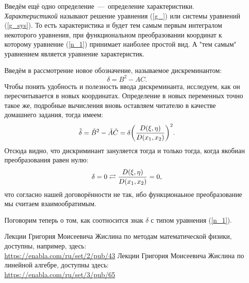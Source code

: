 \documentclass[a4paper,russian]{article}
\begin{document}
Введём ещё одно определение~---~определение характеристики. \emph{Характеристикой} называют решение уравнения (\ref{g_}) или системы уравнений (\ref{g_sys}). То есть характеристика и будет тем самым первым интегралом некоторого уравнения, при функциональном преобразовании координат к которому уравнение (\ref{n_1}) принимает наиболее простой вид. А "тем самым" уравнением является уравнение характеристик.   
\par
Введём в рассмотрение новое обозначение, называемое дискреминантом:
\begin{equation}\label{d}
\delta = B^2-AC.
\end{equation}
Чтобы понять удобность и полезность ввода дискреминанта, исследуем, как он пересчитывается в новых координатах. Определение в новых переменных точно такое же, подробные вычисления вновь оставляем читателю в качестве домашнего задания, тогда имеем:
\begin{equation}\label{d_}
	\tilde \delta = \tilde B^2 - \tilde A \tilde C = \delta \qty(\frac{D\qty(\xi,\eta)}{D\qty(x_1,x_2)})^2.
\end{equation}
Отсюда видно, что дискриминант зануляется тогда и только тогда, когда якобиан преобразования равен нулю:
\[
\delta = 0 \rightleftarrows  \frac{D\qty(\xi,\eta)}{D\qty(x_1,x_2)}=0,
\] что согласно нашей договорённости не так, ибо функционаьное преобразование мы считаем взаимообратимым.
\par
Поговорим теперь о том, как соотносится знак $\delta$ с типом уравнения (\ref{n_1}). 






\newpage
\begin{thebibliography}{5}
Лекции Григория Моисеевича Жислина по методам математической физики, доступны, например, здесь:\\ \url{https://enabla.com/ru/set/2/pub/43}
Лекции Григория Моисеевича Жислина по линейной алгебре, доступны здесь:\\
\url{https://enabla.com/ru/set/3/pub/65}
\end{thebibliography}
\end{document}
